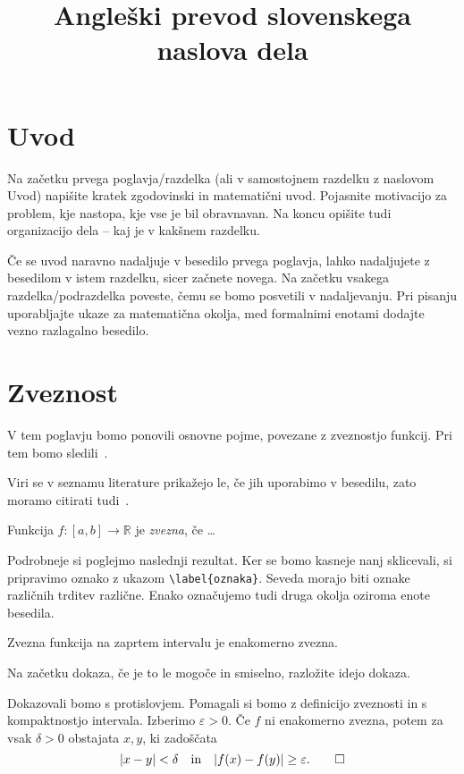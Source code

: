 \documentclass[mat1]{fmfdelo}
\title{Angleški prevod slovenskega naslova dela}
\newcommand{\R}{\mathbb R}
\begin{document}
\section{Uvod}

Na začetku prvega poglavja/razdelka (ali v samostojnem razdelku z naslovom
Uvod) napišite kratek zgodovinski in matematični uvod. Pojasnite motivacijo za
problem, kje nastopa, kje vse je bil obravnavan. Na koncu opišite tudi
organizacijo dela -- kaj je v kakšnem razdelku.

Če se uvod naravno nadaljuje v besedilo prvega poglavja, lahko nadaljujete z
besedilom v istem razdelku, sicer začnete novega. Na začetku vsakega
razdelka/podraz\-delka poveste, čemu se bomo posvetili v nadaljevanju. Pri
pisanju uporabljajte ukaze za matematična okolja, med formalnimi enotami
dodajte vezno razlagalno besedilo.

\section{Zveznost}

V tem poglavju bomo ponovili osnovne pojme, povezane z zveznostjo funkcij. Pri
tem bomo sledili~\cite{glob}.

Viri se v seznamu literature prikažejo le, če jih uporabimo v besedilu,
zato moramo citirati tudi~\cite{lang,zbornik,kalisnik,wiki,vec-avtorjev}.

\begin{definicija}
Funkcija $f\colon [a,b]\to\R$ je \emph{zvezna}, če \ldots
\end{definicija}

Podrobneje si poglejmo naslednji rezultat. Ker se bomo kasneje nanj sklicevali,
si pripravimo oznako z ukazom \verb|\label{oznaka}|. Seveda morajo biti oznake
različnih trditev različne. Enako označujemo tudi druga okolja oziroma enote
besedila.

\begin{izrek}\label{izr:enakomerno}
Zvezna funkcija na zaprtem intervalu je enakomerno zvezna.
\end{izrek}

\begin{dokaz}
Na začetku dokaza, če je to le mogoče in smiselno, razložite idejo dokaza.

Dokazovali bomo s protislovjem. Pomagali si bomo z definicijo zveznosti in s
kompaktnostjo intervala.  Izberimo $\varepsilon>0$. Če $f$ ni enakomerno
zvezna, potem za vsak $\delta>0$ obstajata $x, y$, ki zadoščata
\begin{equation}\label{eq:razlika}
  |x-y|<\delta\quad \text{in}\quad |f(x)-f(y)| \ge \varepsilon. \qedhere
\end{equation}
\end{dokaz}
\end{document}
